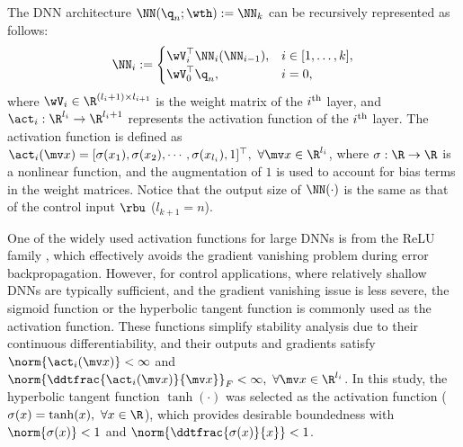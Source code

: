 \documentclass[final,5p,times,twocolumn,authoryear]{elsarticle}
\begin{document}
The DNN architecture $\NN({\q}_n;\wth) := \NN_k$ can be recursively represented as follows:
\begin{equation}
    \NN_i :=
    \begin{cases}
        \wV_i^\top \NN_i(\NN_{i-1}), 
        &
        i\in[1,\dots,k],
        \\
        \wV_0^\top {\q}_n,
        &
        i=0
        ,
    \end{cases}
    \label{eq:DNN:architecture}
\end{equation}
where $\wV_i\in\R^{(l_i+1)\times l_{i+1}}$ is the weight matrix of the $i\textsuperscript{th}$ layer, and $\act_i: \R^{l_i}\to\R^{l_i+1}$ represents the activation function of the $i\textsuperscript{th}$ layer. 
The activation function is defined as $\act_i(\mv x)=[\sigma(x_1),\sigma(x_2),\cdots, \sigma(x_{l_{i}}), 1]^\top,\ \forall\mv x\in\R^{l_i}$, where $\sigma: \R\to\R$ is a nonlinear function, and the augmentation of $1$ is used to account for bias terms in the weight matrices. 
Notice that the output size of $\NN(\cdot)$ is the same as that of the control input $\rbu$ (\ie $l_{k+1}=n$). 


One of the widely used activation functions for large DNNs is from the ReLU family \cite{Maas:2013aa}, which effectively avoids the gradient vanishing problem during error backpropagation. 
However, for control applications, where relatively shallow DNNs are typically sufficient, and the gradient vanishing issue is less severe, the sigmoid function or the hyperbolic tangent function is commonly used as the activation function. 
These functions simplify stability analysis due to their continuous differentiability, and their outputs and gradients satisfy $\norm{\act_i(\mv x)} < \infty$ and  $\norm{\ddtfrac{\act_i(\mv x)}{\mv x}}_F < \infty,\ \forall\mv x\in\R^{l_i}$. 
In this study, the hyperbolic tangent function $\tanh(\cdot)$ was selected as the activation function (\ie $\sigma(x) = \tanh(x),\ \forall x\in\R$), which provides desirable boundedness with $\norm{\sigma(x)}<1$ and $\norm{\ddtfrac{\sigma(x)}{x}}< 1$.
\end{document}
